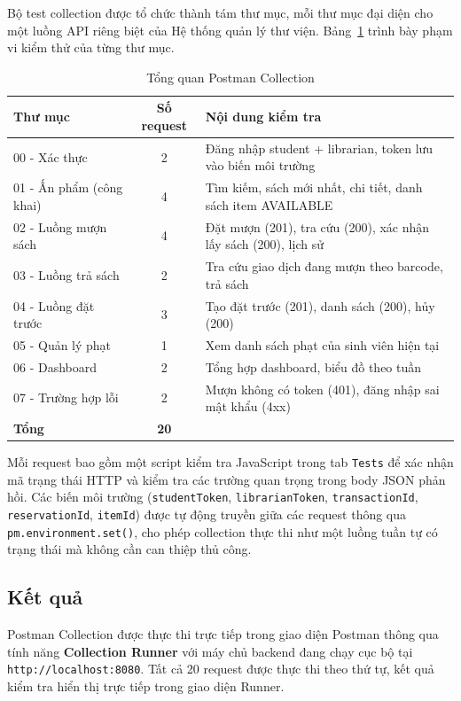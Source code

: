Bộ test collection được tổ chức thành tám thư mục, mỗi thư mục đại diện cho một
luồng API riêng biệt của Hệ thống quản lý thư viện. Bảng~\ref{tab:postman_collection}
trình bày phạm vi kiểm thử của từng thư mục.

\begin{table}[h]
\centering
\caption{Tổng quan Postman Collection}
\label{tab:postman_collection}
\begin{tabular}{|l|c|p{6.5cm}|}
\hline
\textbf{Thư mục} & \textbf{Số request} & \textbf{Nội dung kiểm tra} \\
\hline
00 - Xác thực & 2 & Đăng nhập student + librarian, token lưu vào biến môi trường \\
\hline
01 - Ấn phẩm (công khai) & 4 & Tìm kiếm, sách mới nhất, chi tiết, danh sách item AVAILABLE \\
\hline
02 - Luồng mượn sách & 4 & Đặt mượn (201), tra cứu (200), xác nhận lấy sách (200), lịch sử \\
\hline
03 - Luồng trả sách & 2 & Tra cứu giao dịch đang mượn theo barcode, trả sách \\
\hline
04 - Luồng đặt trước & 3 & Tạo đặt trước (201), danh sách (200), hủy (200) \\
\hline
05 - Quản lý phạt & 1 & Xem danh sách phạt của sinh viên hiện tại \\
\hline
06 - Dashboard & 2 & Tổng hợp dashboard, biểu đồ theo tuần \\
\hline
07 - Trường hợp lỗi & 2 & Mượn không có token (401), đăng nhập sai mật khẩu (4xx) \\
\hline
\textbf{Tổng} & \textbf{20} & \\
\hline
\end{tabular}
\end{table}

Mỗi request bao gồm một script kiểm tra JavaScript trong tab \texttt{Tests} để
xác nhận mã trạng thái HTTP và kiểm tra các trường quan trọng trong body JSON
phản hồi. Các biến môi trường (\texttt{studentToken}, \texttt{librarianToken},
\texttt{transactionId}, \texttt{reservationId}, \texttt{itemId}) được tự động
truyền giữa các request thông qua \texttt{pm.environment.set()}, cho phép
collection thực thi như một luồng tuần tự có trạng thái mà không cần can thiệp
thủ công.

\subsection{Kết quả}

Postman Collection được thực thi trực tiếp trong giao diện Postman thông qua
tính năng \textbf{Collection Runner} với máy chủ backend đang chạy cục bộ tại
\texttt{http://localhost:8080}. Tất cả 20 request được thực thi theo thứ tự,
kết quả kiểm tra hiển thị trực tiếp trong giao diện Runner.

